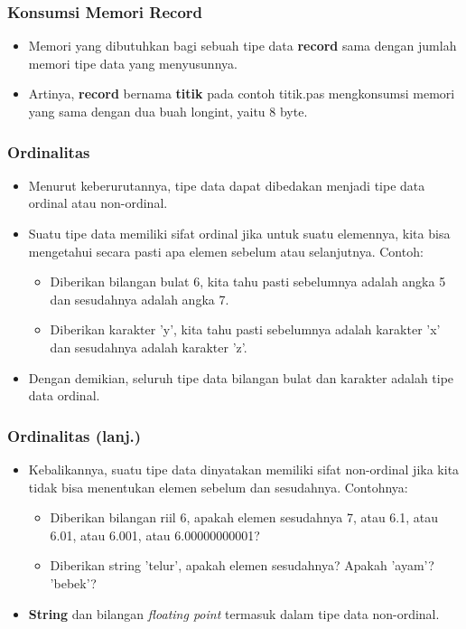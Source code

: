 \begin{frame}
\frametitle{Konsumsi Memori Record}
\begin{itemize}
  \item Memori yang dibutuhkan bagi sebuah tipe data \textbf{record} sama dengan jumlah memori tipe data yang menyusunnya.
  \item Artinya, \textbf{record} bernama \textbf{titik} pada contoh titik.pas mengkonsumsi memori yang sama dengan dua buah longint, yaitu 8 byte.
\end{itemize}
\end{frame}

\begin{frame}
\frametitle{Ordinalitas}
\begin{itemize}
  \item Menurut keberurutannya, tipe data dapat dibedakan menjadi tipe data \alert{ordinal} atau \alert{non-ordinal}.
  \item Suatu tipe data memiliki sifat ordinal jika untuk suatu elemennya, kita bisa mengetahui secara pasti apa elemen sebelum atau selanjutnya. Contoh:
  \begin{itemize}
    \item Diberikan bilangan bulat 6, kita tahu pasti sebelumnya adalah angka 5 dan sesudahnya adalah angka 7.
    \item Diberikan karakter 'y', kita tahu pasti sebelumnya adalah karakter 'x' dan sesudahnya adalah karakter 'z'.
  \end{itemize}
  \item Dengan demikian, seluruh tipe data bilangan bulat dan karakter adalah tipe data ordinal.
\end{itemize}
\end{frame}

\begin{frame}
\frametitle{Ordinalitas (lanj.)}
\begin{itemize}
  \item Kebalikannya, suatu tipe data dinyatakan memiliki sifat non-ordinal jika kita tidak bisa menentukan elemen sebelum dan sesudahnya. Contohnya:
  \begin{itemize}
    \item Diberikan bilangan riil 6, apakah elemen sesudahnya 7, atau 6.1, atau 6.01, atau 6.001, atau 6.00000000001?
    \item Diberikan string 'telur', apakah elemen sesudahnya? Apakah 'ayam'? 'bebek'?
  \end{itemize}
  \item \textbf{String} dan bilangan \textit{floating point} termasuk dalam tipe data non-ordinal.
\end{itemize}
\end{frame}

